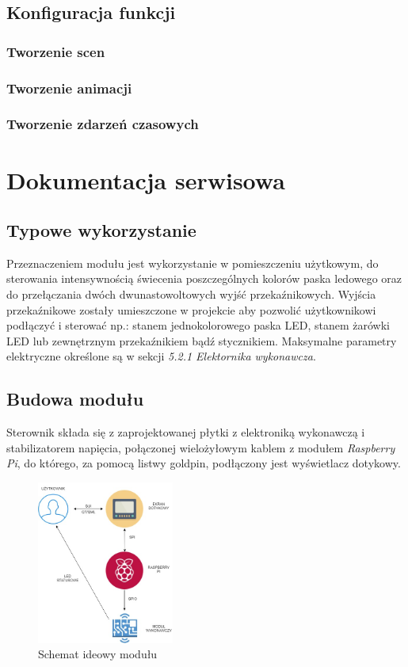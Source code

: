 \documentclass[12pt, eng, twoside, openany, final]{mgr}
\begin{document}
    \section{Konfiguracja funkcji}
        \subsection{Tworzenie scen}
        \subsection{Tworzenie animacji}
        \subsection{Tworzenie zdarzeń czasowych}
%
\chapter{Dokumentacja serwisowa}
\thispagestyle{fancy}
    \section{Typowe wykorzystanie}
    Przeznaczeniem modułu jest wykorzystanie w pomieszczeniu użytkowym, do sterowania intensywnością świecenia poszczególnych kolorów paska ledowego oraz do przełączania dwóch dwunastowoltowych wyjść przekaźnikowych. Wyjścia przekaźnikowe zostały umieszczone w projekcie aby pozwolić użytkownikowi podłączyć i sterować np.: stanem jednokolorowego paska LED, stanem żarówki LED lub zewnętrznym przekaźnikiem bądź stycznikiem. Maksymalne parametry elektryczne określone są w sekcji \emph{5.2.1 Elektornika wykonawcza}.
    \newpage
    
    \section{Budowa modułu}
    Sterownik składa się z zaprojektowanej płytki z elektroniką wykonawczą i stabilizatorem napięcia, połączonej wielożyłowym kablem z modułem \emph{Raspberry Pi}, do którego, za pomocą listwy goldpin, podłączony jest wyświetlacz dotykowy.
        \begin{figure}[H]
        \begin{center}
            \includegraphics[width=0.4\textwidth]{diagram.jpg}
            \caption{Schemat ideowy modułu}
        \end{center}
        \end{figure}
        
\end{document}
